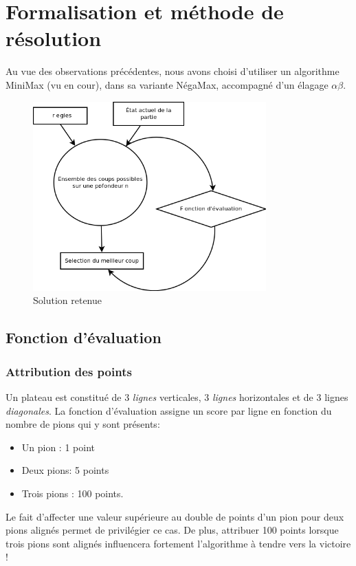 \documentclass[a4paper,12pt]{article}
\begin{document}
\section{Formalisation et méthode de résolution}
Au vue des observations précédentes, nous avons choisi d'utiliser un algorithme MiniMax (vu en cour), dans sa variante NégaMax, accompagné d'un élagage $\alpha\beta$.
\begin{figure}[h]
    \includegraphics[width=0.8\textwidth]{./pix/methode.png}
    \centering
    \caption{Solution retenue}
\end{figure}

\subsection{Fonction d'évaluation}
\subsubsection{Attribution des points}
Un plateau est constitué de 3 \emph{lignes} verticales, 3 \emph{lignes} horizontales et de 3 lignes \emph{diagonales}. La fonction d'évaluation assigne un score par ligne en fonction du nombre de pions qui y sont présents:
\begin{itemize}
	\item Un pion : 1 point
	\item Deux pions: 5 points
	\item Trois pions : 100 points.
\end{itemize}
Le fait d'affecter une valeur supérieure au double de points d'un pion pour deux pions alignés permet de privilégier ce cas. De plus, attribuer 100 points lorsque trois pions sont alignés influencera fortement l'algorithme à tendre vers la victoire !
\end{document}
